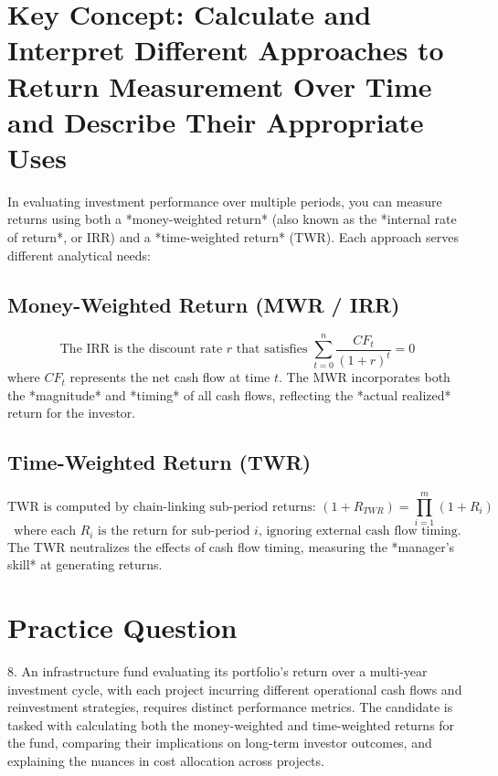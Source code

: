 \section*{Key Concept: Calculate and Interpret Different Approaches to Return Measurement Over Time and Describe Their Appropriate Uses}

In evaluating investment performance over multiple periods, you can measure returns using both a *money-weighted return* (also known as the *internal rate of return*, or IRR) and a *time-weighted return* (TWR). Each approach serves different analytical needs:

\subsection*{Money-Weighted Return (MWR / IRR)}
\[
\text{The IRR is the discount rate } r \text{ that satisfies }
\sum_{t=0}^{n} \frac{CF_{t}}{(1 + r)^{t}} = 0
\]
where \(CF_{t}\) represents the net cash flow at time \(t\). The MWR incorporates both the *magnitude* and *timing* of all cash flows, reflecting the *actual realized* return for the investor.

\subsection*{Time-Weighted Return (TWR)}
\[
\text{TWR is computed by chain-linking sub-period returns: }
(1 + R_{TWR}) = \prod_{i=1}^{m} (1 + R_{i})
\]
\[
\text{where each }R_{i}\text{ is the return for sub-period }i\text{, ignoring external cash flow timing.}
\]
The TWR neutralizes the effects of cash flow timing, measuring the *manager’s skill* at generating returns.

\section*{Practice Question}
8. An infrastructure fund evaluating its portfolio's return over a multi-year investment cycle, with each project incurring different operational cash flows and reinvestment strategies, requires distinct performance metrics. The candidate is tasked with calculating both the money-weighted and time-weighted returns for the fund, comparing their implications on long-term investor outcomes, and explaining the nuances in cost allocation across projects.


